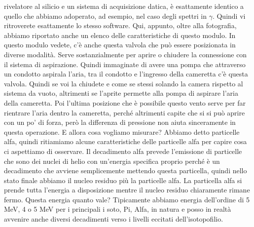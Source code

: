 rivelatore al silicio e un sistema di acquisizione datica, è esattamente identico a quello che abbiamo adoperato, ad esempio, nel caso degli spettri in $\gamma$. Quindi vi ritroverete esattamente lo stesso software. Qui, appunto, oltre alla fotografia, abbiamo riportato anche un elenco delle caratteristiche di questo modulo. In questo modulo vedete, c'è anche questa valvola che può essere posizionata in diverse modalità. Serve sostanzialmente per aprire o chiudere la connessione con il sistema di aspirazione. Quindi immaginate di avere una pompa che attraverso un condotto aspirala l'aria, tra il condotto e l'ingresso della cameretta c'è questa valvola. Quindi se voi la chiudete e come se stessi solando la camera rispetto al sistema da vuoto, altrimenti se l'aprite permette alla pompa di aspirare l'aria della cameretta. Poi l'ultima posizione che è possibile questo vento serve per far rientrare l'aria dentro la cameretta, perché altrimenti capite che si si può aprire con un po' di forza, però la differenza di pressione non aiuta sinceramente in questa operazione. E allora cosa vogliamo misurare? Abbiamo detto particelle alfa, quindi ritiamiamo alcune caratteristiche delle particelle alfa per capire cosa ci aspettiamo di osservare. Il decadimento alfa prevede l'emissione di particelle che sono dei nuclei di helio con un'energia specifica proprio perché è un decadimento che avviene semplicemente mettendo questa particella, quindi nello stato finale abbiamo il nucleo residuo più la particelle alfa. La particella alfa si prende tutta l'energia a disposizione mentre il nucleo residuo chiaramente rimane fermo. Questa energia quanto vale? Tipicamente abbiamo energia dell'ordine di 5 MeV, 4 o 5 MeV per i principali i soto, Pi, Alfa, in natura e posso in realtà avvenire anche diversi decadimenti verso i livelli eccitati dell'isotopofilio. 

